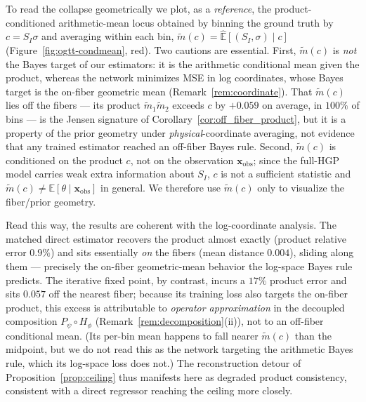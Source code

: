 To read the collapse geometrically we plot, as a \emph{reference}, the product-conditioned arithmetic-mean
locus obtained by binning the ground truth by $c=S_I\sigma$ and averaging within each bin,
$\widetilde m(c)=\widehat{\mathbb{E}}[(S_I,\sigma)\mid c]$ (Figure~\ref{fig:ogtt-condmean}, red). Two cautions
are essential. First, $\widetilde m(c)$ is \emph{not} the Bayes target of our estimators: it is the
arithmetic conditional mean given the product, whereas the network minimizes MSE in log coordinates, whose
Bayes target is the on-fiber geometric mean (Remark~\ref{rem:coordinate}). That $\widetilde m(c)$ lies off
the fibers --- its product $\widetilde m_1\widetilde m_2$ exceeds $c$ by $+0.059$ on average, in $100\%$ of
bins --- is the Jensen signature of Corollary~\ref{cor:off_fiber_product}, but it is a property of the
prior geometry under \emph{physical}-coordinate averaging, not evidence that any trained estimator reached
an off-fiber Bayes rule. Second, $\widetilde m(c)$ is conditioned on the product $c$, not on the
observation $\mathbf{x}_\mathrm{obs}$; since the full-HGP model carries weak extra information about $S_I$,
$c$ is not a sufficient statistic and $\widetilde m(c)\neq\mathbb{E}[\theta\mid\mathbf{x}_\mathrm{obs}]$ in
general. We therefore use $\widetilde m(c)$ only to visualize the fiber/prior geometry.

Read this way, the results are coherent with the log-coordinate analysis. The matched direct estimator
recovers the product almost exactly (product relative error $0.9\%$) and sits essentially \emph{on} the
fibers (mean distance $0.004$), sliding along them --- precisely the on-fiber geometric-mean behavior the
log-space Bayes rule predicts. The iterative fixed point, by contrast, incurs a $17\%$ product error and
sits $0.057$ off the nearest fiber; because its training loss also targets the on-fiber product, this
excess is attributable to \emph{operator approximation} in the decoupled composition
$P_\psi\!\circ\!H_\phi$ (Remark~\ref{rem:decomposition}(ii)), not to an off-fiber conditional mean. (Its
per-bin mean happens to fall nearer $\widetilde m(c)$ than the midpoint, but we do not read this as the
network targeting the arithmetic Bayes rule, which its log-space loss does not.) The reconstruction detour
of Proposition~\ref{prop:ceiling} thus manifests here as degraded product consistency, consistent with a
direct regressor reaching the ceiling more closely.

